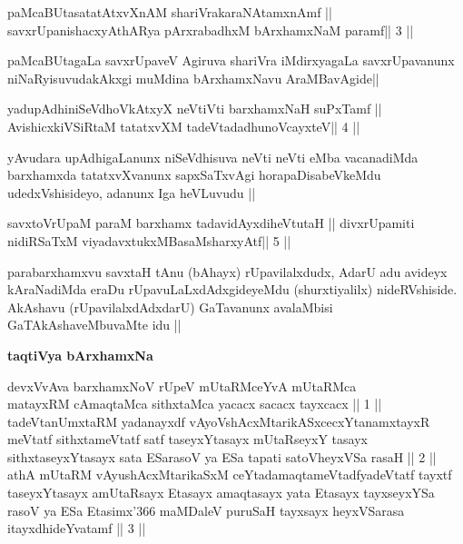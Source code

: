 

\begin{shl}
paMcaBUtasatatAtxvXnAM shariVrakaraNAtamxnAmf ||
savxrUpanishacxyAthARya pArxrabadhxM bArxhamxNaM paramf\hfill || 3 ||
\end{shl}

\begin{artha}
paMcaBUtagaLa savxrUpaveV Agiruva shariVra iMdirxyagaLa savxrUpavanunx
niNaRyisuvudakAkxgi muMdina bArxhamxNavu AraMBavAgide||
\end{artha}




\begin{shl}
yadupAdhiniSeVdhoVkAtxyX neVtiVti barxhamxNaH suPxTamf ||
AvishicxkiVSiRtaM tatatxvXM tadeVtadadhunoVcayxteV\hfill || 4 ||
\end{shl}

\begin{artha}
yAvudara upAdhigaLanunx niSeVdhisuva neVti neVti eMba vacanadiMda
barxhamxda tatatxvXvanunx sapxSaTxvAgi horapaDisabeVkeMdu
udedxVshisideyo, adanunx Iga heVLuvudu ||
\end{artha}



\begin{shl}
savxtoV\s rUpaM paraM barxhamx tadavidAyxdiheVtutaH ||
divxrUpamiti nidiRSaTxM viyadavxtukxMBasaMsharxyAtf\hfill || 5 ||
\end{shl}

\begin{artha}
parabarxhamxvu savxtaH tAnu (bAhayx) rUpavilalxdudx, AdarU adu avideyx
kAraNadiMda eraDu rUpavuLaLxdAdxgideyeMdu (shurxtiyalilx) 
nideRVshiside.
AkAshavu (rUpavilalxdAdxdarU) GaTavanunx avalaMbisi
GaTAkAshaveMbuvaMte idu ||
\end{artha}

\medskip
{\centerline{\textbf{taqtiVya bArxhamxNa}}}

\begin{shl}
devxVvAva barxhamxNoV rUpeV mUtaRMceYvA mUtaRMca\\
matayxRM cAmaqtaMca sithxtaMca yacacx sacacx tayxcacx || 1 ||
tadeVtanUmxtaRM yadanayxdf vAyoVshAcxMtarikASxcecxYtanamxtayxR
meVtatf sithxtameVtatf satf taseyxYtasayx mUtaRseyxY tasayx
sithxtaseyxYtasayx sata ESarasoV ya ESa tapati satoVheyxVSa rasaH || 2 
|| athA mUtaRM vAyushAcxMtarikaSxM ceYtadamaqtameVtadfyadeVtatf tayxtf
taseyxYtasayx amUtaRsayx Etasayx amaqtasayx yata Etasayx tayxseyxYSa
rasoV ya ESa Etasimx\char'366 maMDaleV puruSaH tayxsayx heyxVSarasa
itayxdhideYvatamf || 3 ||
\end{shl}

